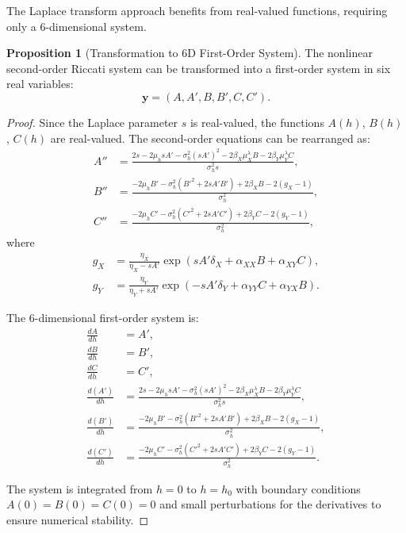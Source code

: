 \documentclass{article}
\theoremstyle{definition}
\newtheorem{proposition}{Proposition}[section]
\begin{document}
The Laplace transform approach benefits from real-valued functions, requiring only a 6-dimensional system.

\begin{proposition}[Transformation to 6D First-Order System]
\label{prop:6d_transform_laplace}
The nonlinear second-order Riccati system can be transformed into a first-order system in six real variables:
\[
\mathbf{y} = (A, A', B, B', C, C').
\]
\end{proposition}

\begin{proof}
Since the Laplace parameter $s$ is real-valued, the functions $A(h)$, $B(h)$, $C(h)$ are real-valued. The second-order equations can be rearranged as:
\[
\begin{aligned}
A'' &= \frac{2s - 2\mu_h s A' - \sigma_h^2 (s A')^2 - 2\beta_X \mu_X^\lambda B - 2\beta_Y \mu_Y^\lambda C}{\sigma_h^2 s}, \\[1ex]
B'' &= \frac{-2\mu_h B' - \sigma_h^2(B'^2 + 2 s A' B') + 2 \beta_X B - 2(g_X - 1)}{\sigma_h^2}, \\[1ex]
C'' &= \frac{-2\mu_h C' - \sigma_h^2(C'^2 + 2 s A' C') + 2 \beta_Y C - 2(g_Y - 1)}{\sigma_h^2},
\end{aligned}
\]
where
\[
\begin{aligned}
g_X &= \frac{\eta_X}{\eta_X - s A'} 
\exp\!\left( s A' \delta_X + \alpha_{XX} B + \alpha_{XY} C \right), \\
g_Y &= \frac{\eta_Y}{\eta_Y + s A'} 
\exp\!\left( -s A' \delta_Y + \alpha_{YY} C + \alpha_{YX} B \right).
\end{aligned}
\]

The 6-dimensional first-order system is:
\begin{align}
\frac{dA}{dh} &= A', \\
\frac{dB}{dh} &= B', \\
\frac{dC}{dh} &= C', \\
\frac{d(A')}{dh} &= \frac{2s - 2\mu_h s A' - \sigma_h^2 (s A')^2 - 2\beta_X \mu_X^\lambda B - 2\beta_Y \mu_Y^\lambda C}{\sigma_h^2 s}, \\
\frac{d(B')}{dh} &= \frac{-2\mu_h B' - \sigma_h^2(B'^2 + 2 s A' B') + 2 \beta_X B - 2(g_X - 1)}{\sigma_h^2}, \\
\frac{d(C')}{dh} &= \frac{-2\mu_h C' - \sigma_h^2(C'^2 + 2 s A' C') + 2 \beta_Y C - 2(g_Y - 1)}{\sigma_h^2}.
\end{align}

The system is integrated from $h = 0$ to $h = h_0$ with boundary conditions $A(0) = B(0) = C(0) = 0$ and small perturbations for the derivatives to ensure numerical stability.
\end{proof}
\end{document}
